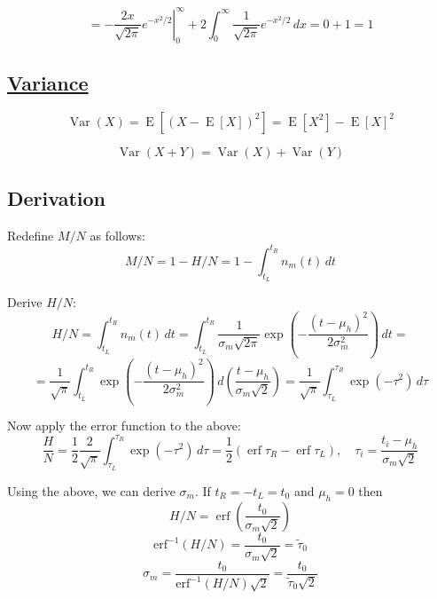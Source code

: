 \documentclass[12pt]{article}
\begin{document}
\[
= \left. -\frac{2x}{\sqrt{2\pi}} e^{-x^2/2} \right|_0^\infty +
2 \int_{0}^{\infty} \frac{1}{\sqrt{2\pi}} e^{-x^2/2} \,dx = 0 + 1 = 1
\]

\subsection*{\href{https://en.wikipedia.org/wiki/Variance}{Variance}}

\begin{equation}
\operatorname{Var} (X) = \operatorname {E} \left[(X-\operatorname {E} [X])^{2}\right] = \operatorname {E} \left[X^{2}\right]-\operatorname {E} [X]^{2}
\label{eq:def_Variance}
\end{equation}

\begin{equation}
\operatorname {Var} (X+Y)=\operatorname {Var} (X)+\operatorname {Var} (Y)
\label{eq:def_Variance_sum}
\end{equation}

\pagebreak

\subsection*{Derivation}

Redefine \( M / N \) as follows:
\begin{equation}
M / N = 1 - H / N = 1 - \int_{t_L}^{t_R} n_m(t) \,dt
\end{equation}

Derive \( H / N \):
\[
H / N = \int_{t_L}^{t_R} n_m(t) \,dt =
\int_{t_L}^{t_R} \frac{1}{\sigma_m\sqrt{2\pi}} \exp\left(-\frac{(t - \mu_h)^2}{2\sigma_m^2} \right) \,dt =
\]
\[
= \frac{1}{\sqrt{\pi}} \int_{t_L}^{t_R} \exp\left(-\frac{(t - \mu_h)^2}{2\sigma_m^2} \right) \,d\left(\frac{t - \mu_h}{\sigma_m\sqrt{2}}\right) =
\frac{1}{\sqrt{\pi}} \int_{\tau_L}^{\tau_R} \exp\left(-\tau^2 \right) \,d\tau
\]

Now apply the error function to the above:
\[
\frac{H}{N} = \frac{1}{2}\frac{2}{\sqrt{\pi}} \int_{\tau_L}^{\tau_R} \exp\left(-\tau^2 \right) \,d\tau =
\frac{1}{2} \left( \operatorname{erf} \tau_R - \operatorname{erf} \tau_L \right) , \quad \tau_i = \frac{t_i - \mu_h}{\sigma_m\sqrt{2}}
\]

Using the above, we can derive \(\sigma_m\). If \(t_R = -t_L = t_0\) and \( \mu_h = 0 \) then
\[
H / N = \operatorname{erf}\left(\frac{t_0}{\sigma_m\sqrt{2}}\right)
\]
\[
\operatorname{erf^{-1}}\left(H / N\right) = \frac{t_0}{\sigma_m\sqrt{2}} = \widetilde{\tau}_0
\]
\[
\sigma_m = \frac{t_0}{\operatorname{erf^{-1}}\left(H / N\right)\sqrt{2}} = \frac{t_0}{\widetilde{\tau}_0\sqrt{2}}
\]
\end{document}
